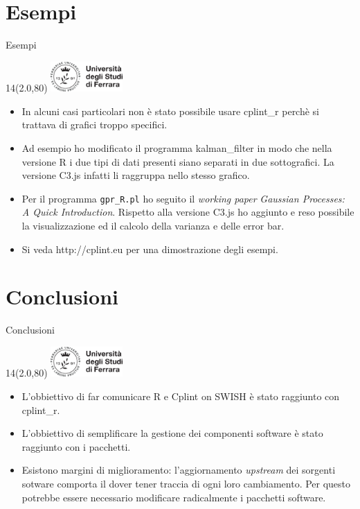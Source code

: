 \documentclass[11pt,xcolor={dvipsnames},default]{beamer} %
\newcommand{\MyLogo}{%
\begin{textblock}{14}(2.0,80)
 \includegraphics[height=1.15cm, angle=0]{logo}
\end{textblock}
}
\begin{document}
\section{Esempi}
\begin{frame}{Esempi}
\transboxin
\MyLogo
\begin{itemize}
\item In alcuni casi particolari non è stato possibile usare cplint\_r perchè 
si trattava di grafici troppo specifici.
\item Ad esempio ho modificato il programma kalman\_filter in modo che nella 
versione R i due tipi di dati presenti siano separati in due 
sottografici. La versione C3.js infatti li raggruppa nello stesso grafico.
\item Per il programma \texttt{gpr\_R.pl} ho seguito il 
\emph{working paper} \emph{Gaussian Processes: A Quick Introduction}. 
Rispetto alla versione C3.js ho aggiunto e reso possibile la 
visualizzazione ed il calcolo della varianza e delle error bar.
\item Si veda http://cplint.eu per una dimostrazione degli esempi.
\end{itemize}
\end{frame}

\section{Conclusioni}
\begin{frame}{Conclusioni}
\transboxin
\MyLogo
\begin{itemize}
\item L'obbiettivo di far comunicare R e Cplint on SWISH è stato raggiunto con
cplint\_r.
\item L'obbiettivo di semplificare la gestione dei componenti software è stato 
raggiunto con i pacchetti.
\item Esistono margini di miglioramento: l'aggiornamento \emph{upstream} dei 
sorgenti sotware comporta il dover tener traccia di ogni loro cambiamento. 
Per questo potrebbe essere necessario modificare radicalmente i pacchetti 
software.
\end{itemize}
\end{frame}
\end{document}
